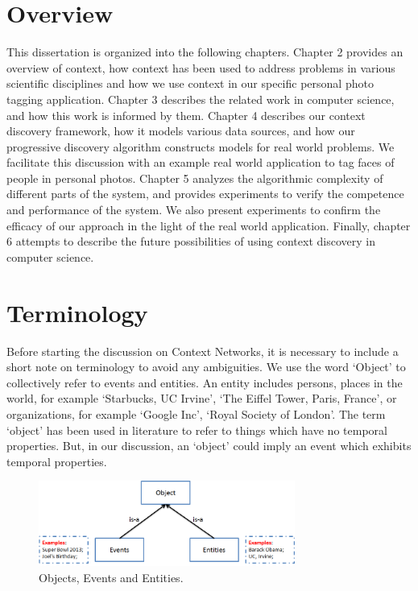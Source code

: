 \section{Overview}
This dissertation is organized into the following chapters. Chapter 2 provides an overview of context, how context has been used to address problems in various scientific disciplines and how we use context in our specific personal photo tagging application. Chapter 3 describes the related work in computer science, and how this work is informed by them. Chapter 4 describes our context discovery framework, how it models various data sources, and how our progressive discovery algorithm constructs models for real world problems. We facilitate this discussion with an example real world application to tag faces of people in personal photos. Chapter 5 analyzes the algorithmic complexity of different parts of the system, and provides experiments to verify the competence and performance of the system. We also present experiments to confirm the efficacy of our approach in the light of the real world application. Finally, chapter 6 attempts to describe the future possibilities of using context discovery in computer science.


\section{Terminology}
Before starting the discussion on Context Networks, it is necessary to include a short note on terminology to avoid any ambiguities. We use the word `Object' to collectively refer to events and entities. An entity includes persons, places in the world, for example `Starbucks, UC Irvine', `The Eiffel Tower, Paris, France', or organizations, for example `Google Inc', `Royal Society of London'. The term `object' has been used in literature to refer to things which have no temporal properties. But, in our discussion, an `object' could imply an event which exhibits temporal properties.

\begin{figure}[h]
\centering
\includegraphics[width=0.75\textwidth]{media/chapter1/terminology.png}
\caption{Objects, Events and Entities.}
\label{fig:terminology}
\end{figure}